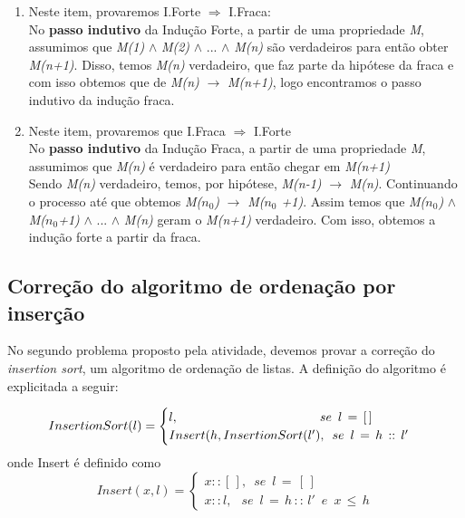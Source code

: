 \documentclass[a4paper, 10pt]{article}
\begin{document}
\begin{enumerate}
\item Neste item, provaremos I.Forte $\Rightarrow$ I.Fraca:
	\\No \textbf{passo indutivo} da Indução Forte, a partir de uma propriedade \textit{M}, assumimos que \textit{M(1)} $\wedge$ \textit{M(2)} $\wedge$ ... $\wedge$ \textit{M(n)} são verdadeiros para então obter \textit{M(n+1)}. 
    Disso, temos  \textit{M(n)} verdadeiro, que faz parte da hipótese da fraca e com isso obtemos que de \textit{M(n)} $\rightarrow$ \textit{M(n+1)}, logo encontramos o passo indutivo da indução fraca.

\item Neste item, provaremos que I.Fraca $\Rightarrow$ I.Forte 
	\\	No \textbf{passo indutivo} da Indução Fraca, a partir de uma propriedade \textit{M}, assumimos que \textit{M(n)} é verdadeiro para então chegar em \textit{M(n+1)}
    \\	Sendo \textit{M(n)} verdadeiro, temos, por hipótese, \textit{M(n-1)} $\rightarrow$ \textit{M(n)}. Continuando o processo até que obtemos \textit{M($n_0$)} $\rightarrow$ \textit{M($n_0$ +1)}. Assim temos que \textit{M($n_0$)} $\wedge$ \textit{M($n_0$+1)} $\wedge$ ... $\wedge$ \textit{M(n)} geram o \textit{M(n+1)} verdadeiro.
    Com isso, obtemos a indução forte a partir da fraca.
\end{enumerate}


\subsection{Correção do algoritmo de ordenação por inserção}
\label{sec:insertion}

No segundo problema proposto pela atividade, devemos provar a correção do \textit{insertion sort}, um algoritmo de ordenação de listas. A definição do algoritmo é explicitada a seguir:

  \begin{equation}
  \label{eq:sort}
      InsertionSort(l) =
      \begin{cases}
          l, \hspace{11.2em}			 	      se \enspace l\,=\,[\,]\\
          Insert(h, InsertionSort(l'),\enspace se \enspace l\,=\,h\,::\,l'
      \end{cases}
  \end{equation}
  onde Insert é definido como
  \begin{equation}
  \label{eq:insert}
      Insert(x,l) =
      \begin{cases}
          x::[\,],\enspace se\enspace l\,=\,[\,] \\
          x::l,\: \enspace se\enspace l\,=\,h\,::\,l'\enspace e \enspace x\, \leq \, h
      \end{cases}
  \end{equation}
\end{document}
